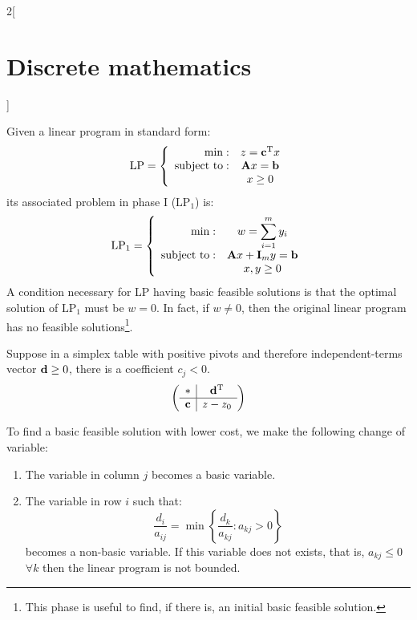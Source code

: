\documentclass[../../../main.tex]{subfiles}
\begin{document}
\begin{multicols}{2}[\section{Discrete mathematics}]
\begin{theorem}
    \end{theorem}
    \begin{definition}
        Given a linear program in standard form:
        $$\text{LP}=\left\{
            \begin{array}{rc}
                \min:              & z=\vb{c}^{\mathrm{T}}x \\
                \text{subject to}: & \boldsymbol{\mathrm{A}}x=\boldsymbol{\mathrm{b}}   \\
                                   & x\geq 0
            \end{array}\right.$$ its associated problem in phase I ($\text{LP}_1$) is: $$\text{LP}_1=\left\{\begin{array}{rc}
                \min:              & \displaystyle w=\sum_{i=1}^my_i \\
                \text{subject to}: & \boldsymbol{\mathrm{A}}x+\boldsymbol{\mathrm{I}}_my=\boldsymbol{\mathrm{b}}        \\
                                   & x,y\geq 0
            \end{array}\right.$$
        A condition necessary for LP having basic feasible solutions is that the optimal solution of $\text{LP}_1$ must be $w=0$. In fact, if $w\ne 0$, then the original linear program has no feasible solutions\footnote{This phase is useful to find, if there is, an initial basic feasible solution.}.
    \end{definition}
    \begin{prop}
        Suppose in a simplex table with positive pivots and therefore independent-terms vector $\boldsymbol{\mathrm{d}}\geq 0$, there is a coefficient $c_j<0$. $$\left(\begin{array}{c|c}
                    *      & \vb{d}^{\mathrm{T}} \\
                    \hline
                    \boldsymbol{\mathrm{c}} & z-z_0
                \end{array}\right)$$
    \end{prop}
    To find a basic feasible solution with lower cost, we make the following change of variable:
    \begin{enumerate}
        \item The variable in column $j$ becomes a basic variable.
        \item The variable in row $i$ such that: $$\frac{d_i}{a_{ij}}=\min\left\{\frac{d_k}{a_{kj}}:a_{kj}>0\right\}$$ becomes a non-basic variable. If this variable does not exists, that is, $a_{kj}\leq0$ $\forall k$ then the linear program is not bounded.
    \end{enumerate}

\end{multicols}
\end{document}
